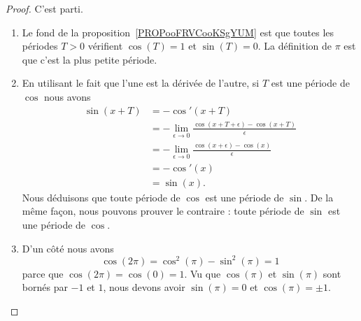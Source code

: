 \begin{proof}
	C'est parti.
	\begin{enumerate}
		\item
		      Le fond de la proposition~\ref{PROPooFRVCooKSgYUM} est que toutes les périodes \( T>0\) vérifient \( \cos(T)=1\) et \( \sin(T)=0\). La définition de \( \pi\) est que c'est la plus petite période.
		\item
		      En utilisant le fait que l'une est la dérivée de l'autre, si \( T\) est une période de \( \cos\) nous avons
		      \begin{subequations}
			      \begin{align}
				      \sin(x+T) & =-\cos'(x+T)                                                            \\
				                & =-\lim_{\epsilon\to 0}\frac{ \cos(x+T+\epsilon)-\cos(x+T) }{\epsilon  } \\
				                & =-\lim_{\epsilon\to 0}\frac{ \cos(x+\epsilon)-\cos(x) }{ \epsilon }     \\
				                & =-\cos'(x)                                                              \\
				                & =\sin(x).
			      \end{align}
		      \end{subequations}
		      Nous déduisons que toute période de \( \cos\) est une période de \( \sin\). De la même façon, nous pouvons prouver le contraire : toute période de \( \sin\) est une période de \( \cos\).
		\item
		      D'un côté nous avons
		      \begin{equation}
			      \cos(2\pi)=\cos^2(\pi)-\sin^2(\pi)=1
		      \end{equation}
		      parce que \( \cos(2\pi)=\cos(0)=1\). Vu que \( \cos(\pi)\) et \( \sin(\pi)\) sont bornés par \( -1\) et \( 1\), nous devons avoir \( \sin(\pi)=0\) et \( \cos(\pi)=\pm 1\).


\end{enumerate}
\end{proof}
